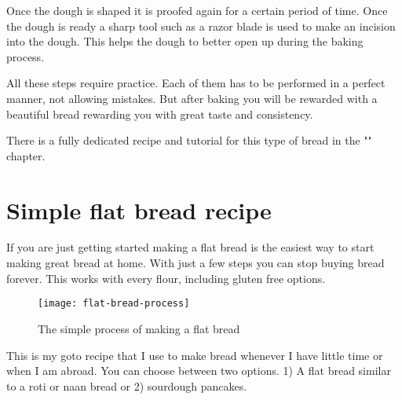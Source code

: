 Once the dough is shaped it is proofed again for a certain
period of time. Once the dough is ready a sharp tool such
as a razor blade is used to make an incision into the dough.
This helps the dough to better open up during the baking process.

All these steps require practice. Each of them has to be
performed in a perfect manner, not allowing mistakes.
But after baking you will be rewarded with a beautiful bread
rewarding you with great taste and consistency.

There is a fully dedicated recipe and tutorial
for this type of bread in the "" chapter.

\section{Simple flat bread recipe}
\label{section:flat-bread-recipe}

If you are just getting started making a flat bread is the
easiest way to start making great bread at home. With just a
few steps you can stop buying bread forever. This works with
every flour, including gluten free options.

\begin{figure}[htb!]
  \texttt{[image: flat-bread-process]}
  \centering
  \caption{The simple process of making a flat bread}
\end{figure}

This is my goto recipe that I use to make bread whenever
I have little time or when I am abroad. You can choose
between two options. 1) A flat bread similar to a roti or naan bread
or 2) sourdough pancakes.

\begin{table}[htb!]
  \centering
  \caption{\label{tab:flat-bread-ingredients}Flat breads or pancakes recipe for 1 person. Multiply the ingredients
  to increase portion size. Refer to the section \ref{section:bakers-math} "" to learn how
  to understand and use the percentages properly.} 
\end{table}

